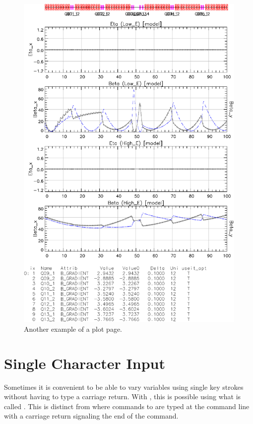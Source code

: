 \begin{figure}
  \centering
  \includegraphics[width=5in]{plot-page2.pdf}
  \caption{Another example of a plot page.}
  \label{f:plot.page2}
\end{figure}

\vfill
\break
\section{Single Character Input}

Sometimes it is convenient to be able to vary variables using single
key strokes without having to type a carriage return.  With \tao, this
is possible using what is called . This is distinct
from  where commands to \tao are typed at the command
line with a carriage return signaling the end of the command. 

